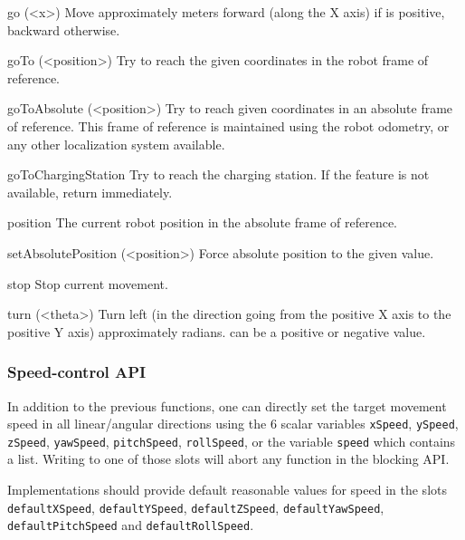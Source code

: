 \begin{urbiscriptapi}
\item[go](<x>) Move approximately  meters forward (along the X axis)
  if  is positive, backward otherwise.


\item[goTo](<position>) Try to reach the given coordinates in the robot
  frame of reference.


\item[goToAbsolute](<position>) Try to reach given coordinates in an
  absolute frame of reference. This frame of reference is maintained using
  the robot odometry, or any other localization system available.


\item[goToChargingStation] Try to reach the charging station. If the feature
  is not available, return immediately.


\item[position] The current robot position in the absolute frame of
  reference.


\item[setAbsolutePosition](<position>) Force absolute position to the given
  value.


\item[stop] Stop current movement.


\item[turn](<theta>) Turn left (in the direction going from the positive X
  axis to the positive Y axis) approximately  radians.
   can be a positive or negative value.
\end{urbiscriptapi}

\subsubsection{Speed-control API}

In addition to the previous functions, one can directly set the target
movement speed in all linear/angular directions using the 6 scalar variables
\lstinline{xSpeed}, \lstinline{ySpeed}, \lstinline{zSpeed},
\lstinline{yawSpeed}, \lstinline{pitchSpeed}, \lstinline{rollSpeed}, or the
variable \lstinline{speed} which contains a list.  Writing to one of those
slots will abort any function in the blocking API.

Implementations should provide default reasonable values for speed in the
slots \lstinline{defaultXSpeed}, \lstinline{defaultYSpeed},
\lstinline{defaultZSpeed}, \lstinline{defaultYawSpeed},
\lstinline{defaultPitchSpeed} and \lstinline{defaultRollSpeed}.

